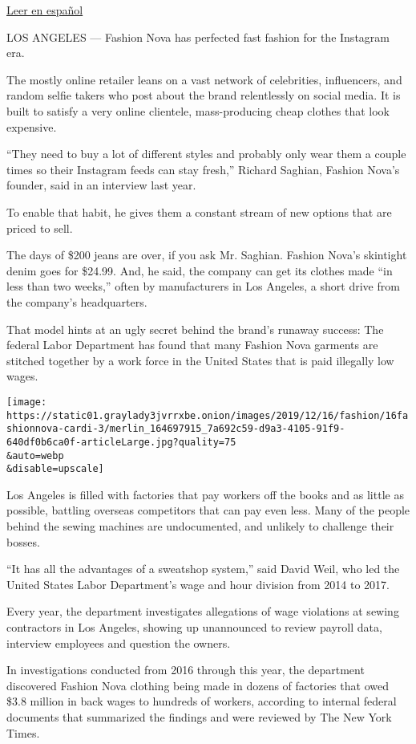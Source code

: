 \href{https://www.nytimes3xbfgragh.onion/es/2019/12/17/espanol/negocios/nova-trabajadores.html}{Leer
en español}

LOS ANGELES --- Fashion Nova has perfected fast fashion for the
Instagram era.

The mostly online retailer leans on a vast network of celebrities,
influencers, and random selfie takers who post about the brand
relentlessly on social media. It is built to satisfy a very online
clientele, mass-producing cheap clothes that look expensive.

``They need to buy a lot of different styles and probably only wear them
a couple times so their Instagram feeds can stay fresh,'' Richard
Saghian, Fashion Nova's founder, said in an interview last year.

To enable that habit, he gives them a constant stream of new options
that are priced to sell.

The days of \$200 jeans are over, if you ask Mr. Saghian. Fashion Nova's
skintight denim goes for \$24.99. And, he said, the company can get its
clothes made ``in less than two weeks,'' often by manufacturers in Los
Angeles, a short drive from the company's headquarters.

That model hints at an ugly secret behind the brand's runaway success:
The federal Labor Department has found that many Fashion Nova garments
are stitched together by a work force in the United States that is paid
illegally low wages.

\texttt{[image: https://static01.graylady3jvrrxbe.onion/images/2019/12/16/fashion/16fashionnova-cardi-3/merlin\_164697915\_7a692c59-d9a3-4105-91f9-640df0b6ca0f-articleLarge.jpg?quality=75\\\&auto=webp\\\&disable=upscale]}

Los Angeles is filled with factories that pay workers off the books and
as little as possible, battling overseas competitors that can pay even
less. Many of the people behind the sewing machines are undocumented,
and unlikely to challenge their bosses.

``It has all the advantages of a sweatshop system,'' said David Weil,
who led the United States Labor Department's wage and hour division from
2014 to 2017.

Every year, the department investigates allegations of wage violations
at sewing contractors in Los Angeles, showing up unannounced to review
payroll data, interview employees and question the owners.

In investigations conducted from 2016 through this year, the department
discovered Fashion Nova clothing being made in dozens of factories that
owed \$3.8 million in back wages to hundreds of workers, according to
internal federal documents that summarized the findings and were
reviewed by The New York Times.

